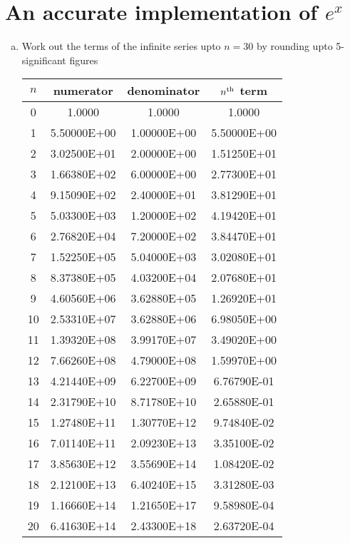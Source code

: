 \section{An accurate implementation of $e^x$}
\begin{enumerate}[(a)]
	\item Work out the terms of the infinite series upto $n=30$ by rounding upto 5-significant figures\\
			\begin{table}[H]
			\centering
				\begin{tabular}{c|c|c|c}
					$n$ & numerator & denominator & $n^{\mathrm{th}}$ term \\
					\hline
					0	&	1.0000	&	1.0000	& 1.0000\\
					1 & 5.50000E+00 & 1.00000E+00 & 5.50000E+00\\
					2 & 3.02500E+01 & 2.00000E+00 & 1.51250E+01 \\
					3 & 1.66380E+02 & 6.00000E+00 & 2.77300E+01\\
					4 & 9.15090E+02 & 2.40000E+01 & 3.81290E+01\\
					5 & 5.03300E+03 & 1.20000E+02 & 4.19420E+01\\
					6 & 2.76820E+04 & 7.20000E+02 & 3.84470E+01\\
					7 & 1.52250E+05 & 5.04000E+03 & 3.02080E+01\\
					8 & 8.37380E+05 & 4.03200E+04 & 2.07680E+01\\
					9 & 4.60560E+06 & 3.62880E+05 & 1.26920E+01\\
					10 & 2.53310E+07 & 3.62880E+06 & 6.98050E+00\\
					11 & 1.39320E+08 & 3.99170E+07 & 3.49020E+00\\
					12 & 7.66260E+08 & 4.79000E+08 & 1.59970E+00\\
					13 & 4.21440E+09 & 6.22700E+09 & 6.76790E-01\\
					14 & 2.31790E+10 & 8.71780E+10 & 2.65880E-01\\
					15 & 1.27480E+11 & 1.30770E+12 & 9.74840E-02\\
					16 & 7.01140E+11 & 2.09230E+13 & 3.35100E-02\\
					17 & 3.85630E+12 & 3.55690E+14 & 1.08420E-02\\
					18 & 2.12100E+13 & 6.40240E+15 & 3.31280E-03\\
					19 & 1.16660E+14 & 1.21650E+17 & 9.58980E-04\\
					20 & 6.41630E+14 & 2.43300E+18 & 2.63720E-04\\

\end{tabular}
\end{table}
\end{enumerate}
